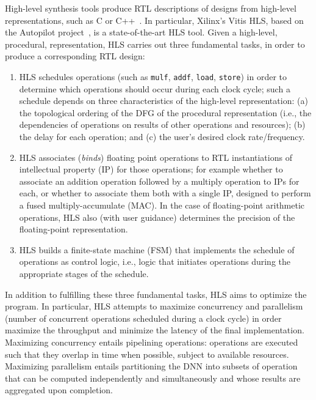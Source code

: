 \documentclass[10pt]{sig-alternate}
\begin{document}
High-level synthesis tools produce RTL descriptions of designs from
high-level representations, such as C or C++~\cite{10.1145/2514740,ferrandi2021bambu}.
In particular, Xilinx's Vitis HLS, based on the Autopilot project~\cite{Zhang2008}, is a state-of-the-art HLS tool. Given a high-level,
procedural, representation, HLS carries out three fundamental tasks,
in order to produce a corresponding RTL design:
\begin{enumerate}
\item HLS schedules operations (such as \texttt{mulf}, \texttt{addf}, \texttt{load},
\texttt{store}) in order to determine which operations should occur
during each clock cycle; such a schedule depends on three characteristics
of the high-level representation:
(a) the topological ordering of the DFG of the procedural representation
(i.e., the dependencies of operations on results of other operations
and resources);
(b) the delay for each operation; and
(c) the user's desired clock rate/frequency.
\item HLS associates (\emph{binds}) floating point operations to
RTL instantiations of intellectual property (IP) for those operations;
for example whether to associate an addition operation followed by
a multiply operation to IPs for each, or whether to associate them
both with a single IP, designed to perform a fused multiply-accumulate
(MAC). In the case of floating-point arithmetic operations, HLS also (with
user guidance) determines the precision of the floating-point representation.
\item HLS builds a finite-state machine (FSM) that implements the schedule
of operations as control logic, i.e., logic that initiates operations
during the appropriate stages of the schedule.
\end{enumerate}
In addition to fulfilling these three fundamental tasks, HLS aims to optimize the program. In particular, HLS attempts
to maximize concurrency and parallelism (number of concurrent operations
scheduled during a clock cycle) in order maximize the throughput and
minimize the latency of the final implementation. Maximizing concurrency
entails pipelining operations: operations are executed such that they
overlap in time when possible, subject to available resources. Maximizing
parallelism entails partitioning the DNN into subsets of operation
that can be computed independently and simultaneously and whose results
are aggregated upon completion.
\end{document}

